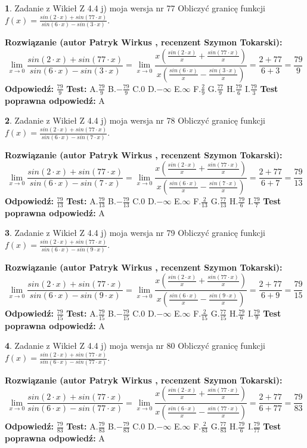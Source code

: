 \documentclass[12pt, a4paper]{article}
\theoremstyle{definition} %
\newtheorem{zad}{}
\newcommand{\zadStart}[1]{\begin{zad}#1\newline}
\newcommand{\zadStop}{\end{zad}}
\newcommand{\rozwStart}[2]{\noindent \textbf{Rozwiązanie (autor #1 , recenzent #2): }\newline}
\newcommand{\rozwStop}{\newline}
\newcommand{\odpStart}{\noindent \textbf{Odpowiedź:}\newline}
\newcommand{\odpStop}{\newline}
\newcommand{\testStart}{\noindent \textbf{Test:}\newline}
\newcommand{\testStop}{\newline}
\newcommand{\kluczStart}{\noindent \textbf{Test poprawna odpowiedź:}\newline}
\newcommand{\kluczStop}{\newline}
\begin{document}
\zadStart{Zadanie z Wikieł Z 4.4 j) moja wersja nr 77}
Obliczyć granicę funkcji $f(x)=\frac{sin(2\cdot x) +sin(77\cdot x)}{sin(6\cdot x) -sin(3\cdot x)}$.
\zadStop
\rozwStart{Patryk Wirkus}{Szymon Tokarski}
$$\lim\limits_{x\to 0}\frac{sin(2\cdot x) +sin(77\cdot x)}{sin(6\cdot x) -sin(3\cdot x)}=\lim\limits_{x\to 0}\frac{x(\frac{sin(2\cdot x)}{x}+\frac{sin(77\cdot x)}{x})}{x(\frac{sin(6\cdot x)}{x}-\frac{sin(3\cdot x)}{x})}=\frac{2+77}{6+3} = \frac{79}{9}$$
\rozwStop
\odpStart
$\frac{79}{9}$
\odpStop
\testStart
A.$\frac{79}{9}$
B.$-\frac{79}{9}$
C.$0$
D.$-\infty$
E.$\infty$
F.$\frac{2}{9}$
G.$\frac{77}{9}$
H.$\frac{79}{6}$
I.$\frac{79}{3}$
\testStop
\kluczStart
A
\kluczStop



\zadStart{Zadanie z Wikieł Z 4.4 j) moja wersja nr 78}
Obliczyć granicę funkcji $f(x)=\frac{sin(2\cdot x) +sin(77\cdot x)}{sin(6\cdot x) -sin(7\cdot x)}$.
\zadStop
\rozwStart{Patryk Wirkus}{Szymon Tokarski}
$$\lim\limits_{x\to 0}\frac{sin(2\cdot x) +sin(77\cdot x)}{sin(6\cdot x) -sin(7\cdot x)}=\lim\limits_{x\to 0}\frac{x(\frac{sin(2\cdot x)}{x}+\frac{sin(77\cdot x)}{x})}{x(\frac{sin(6\cdot x)}{x}-\frac{sin(7\cdot x)}{x})}=\frac{2+77}{6+7} = \frac{79}{13}$$
\rozwStop
\odpStart
$\frac{79}{13}$
\odpStop
\testStart
A.$\frac{79}{13}$
B.$-\frac{79}{13}$
C.$0$
D.$-\infty$
E.$\infty$
F.$\frac{2}{13}$
G.$\frac{77}{13}$
H.$\frac{79}{6}$
I.$\frac{79}{7}$
\testStop
\kluczStart
A
\kluczStop



\zadStart{Zadanie z Wikieł Z 4.4 j) moja wersja nr 79}
Obliczyć granicę funkcji $f(x)=\frac{sin(2\cdot x) +sin(77\cdot x)}{sin(6\cdot x) -sin(9\cdot x)}$.
\zadStop
\rozwStart{Patryk Wirkus}{Szymon Tokarski}
$$\lim\limits_{x\to 0}\frac{sin(2\cdot x) +sin(77\cdot x)}{sin(6\cdot x) -sin(9\cdot x)}=\lim\limits_{x\to 0}\frac{x(\frac{sin(2\cdot x)}{x}+\frac{sin(77\cdot x)}{x})}{x(\frac{sin(6\cdot x)}{x}-\frac{sin(9\cdot x)}{x})}=\frac{2+77}{6+9} = \frac{79}{15}$$
\rozwStop
\odpStart
$\frac{79}{15}$
\odpStop
\testStart
A.$\frac{79}{15}$
B.$-\frac{79}{15}$
C.$0$
D.$-\infty$
E.$\infty$
F.$\frac{2}{15}$
G.$\frac{77}{15}$
H.$\frac{79}{6}$
I.$\frac{79}{9}$
\testStop
\kluczStart
A
\kluczStop



\zadStart{Zadanie z Wikieł Z 4.4 j) moja wersja nr 80}
Obliczyć granicę funkcji $f(x)=\frac{sin(2\cdot x) +sin(77\cdot x)}{sin(6\cdot x) -sin(77\cdot x)}$.
\zadStop
\rozwStart{Patryk Wirkus}{Szymon Tokarski}
$$\lim\limits_{x\to 0}\frac{sin(2\cdot x) +sin(77\cdot x)}{sin(6\cdot x) -sin(77\cdot x)}=\lim\limits_{x\to 0}\frac{x(\frac{sin(2\cdot x)}{x}+\frac{sin(77\cdot x)}{x})}{x(\frac{sin(6\cdot x)}{x}-\frac{sin(77\cdot x)}{x})}=\frac{2+77}{6+77} = \frac{79}{83}$$
\rozwStop
\odpStart
$\frac{79}{83}$
\odpStop
\testStart
A.$\frac{79}{83}$
B.$-\frac{79}{83}$
C.$0$
D.$-\infty$
E.$\infty$
F.$\frac{2}{83}$
G.$\frac{77}{83}$
H.$\frac{79}{6}$
I.$\frac{79}{77}$
\testStop
\kluczStart
A
\kluczStop
\end{document}
